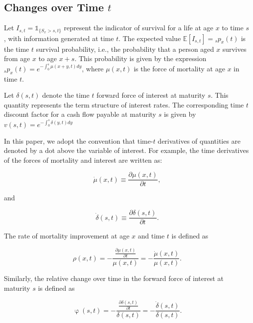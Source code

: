 \documentclass[12pt]{article}
\begin{document}
\subsection{Changes over Time $t$}

Let \( I_{s,t} = \mathds{1}_{\{S_x > s,t\}} \) represent the indicator of survival for a life at age \( x \) to time \( s \), with information generated at time \( t \). The expected value \( \mathbb{E}[I_{s,t}] = {}_s p_x(t) \) is the time \( t \) survival probability, i.e., the probability that a person aged \( x \) survives from age \( x \) to age \( x+s \). This probability is given by the expression ${}_sp_x(t)=e^{-\int_{0}^{s}\mu(x+y,t)dy}$, where \(\mu(x,t)\) is the force of mortality at age \(x\) in time $t$.

Let \( \delta(s,t) \) denote the time \( t \) forward force of interest at maturity \( s \). This quantity represents the term structure of interest rates. The corresponding time \( t \) discount factor for a cash flow payable at maturity \( s \) is given by ${v}(s,t)=e^{-\int_{0}^{s}\delta(y,t)dy}$

In this paper, we adopt the convention that time-$t$ derivatives of quantities are denoted by a dot above the variable of interest. For example, the time derivatives of the forces of mortality and interest are written as:


\begin{equation} \label{eq:mudot}
\dot{\mu}(x,t)\equiv\frac{\partial\mu(x,t)}{\partial t},
\end{equation}

and 

\begin{equation} \label{eq:deltadot}
\dot{\delta}(s,t)\equiv\frac{\partial\delta(s,t)}{\partial t}.
\end{equation}

The rate of mortality improvement at age \(x\) and time $t$ is defined as

\begin{equation} \label{eq:rho}
\rho(x,t)=-\frac{\frac{\partial \mu(x,t)}{\partial t}}{\mu(x,t)} = - \frac{\dot{\mu}(x,t)}{\mu(x,t)}.
\end{equation}

Similarly, the relative change over time in the forward force of interest at maturity $s$ is defined as 

\begin{equation} \label{eq:phi}
\upvarphi(s,t)=-\frac{\frac{\partial \delta(s,t)}{\partial t}}{\delta(s,t)} = -\frac{\dot{\delta}(s,t)}{\delta(s,t)}.
\end{equation}
\end{document}
